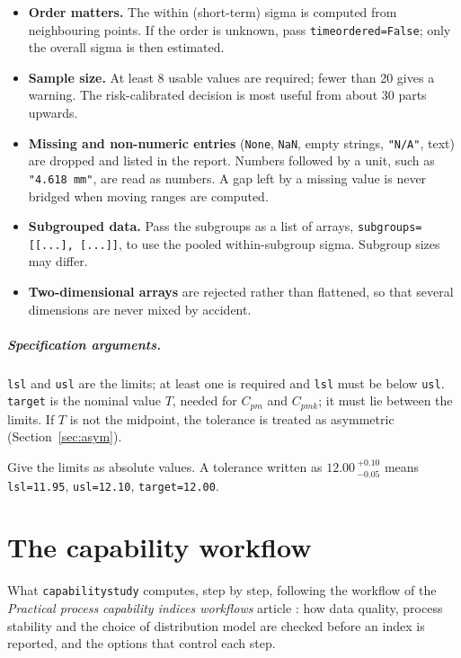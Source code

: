 \documentclass[a4paper,11pt,oneside,openany,parskip=half-,headings=standardclasses,toc=flat,numbers=noenddot]{scrbook}
\newcommand{\code}[1]{\texttt{\begingroup\def\_{\textunderscore\allowbreak}#1\endgroup}}
\newenvironment{chapterintro}{\begingroup\sffamily\small\color{muted}\noindent\ignorespaces}{\par\endgroup\medskip}
\newcommand{\secref}[1]{Section~\ref{#1}}
\begin{document}
\begin{itemize}
\item \textbf{Order matters.} The within (short-term) sigma is computed from neighbouring points. If
  the order is unknown, pass \code{time\_ordered=False}; only the overall sigma is then estimated.
\item \textbf{Sample size.} At least 8 usable values are required; fewer than 20 gives a warning.
  The risk-calibrated decision is most useful from about 30 parts upwards.
\item \textbf{Missing and non-numeric entries} (\code{None}, \code{NaN}, empty strings, \code{"N/A"},
  text) are dropped and listed in the report. Numbers followed by a unit, such as \code{"4.618 mm"},
  are read as numbers. A gap left by a missing value is never bridged when moving ranges are computed.
\item \textbf{Subgrouped data.} Pass the subgroups as a list of arrays, \code{subgroups=[[...], [...]]},
  to use the pooled within-subgroup sigma. Subgroup sizes may differ.
\item \textbf{Two-dimensional arrays} are rejected rather than flattened, so that several dimensions
  are never mixed by accident.
\end{itemize}

\paragraph{Specification arguments.} \code{lsl} and \code{usl} are the limits; at least one is
required and \code{lsl} must be below \code{usl}. \code{target} is the nominal value $T$, needed for
$C_{pm}$ and $C_{pmk}$; it must lie between the limits. If $T$ is not the midpoint, the tolerance is
treated as asymmetric (\secref{sec:asym}).

\begin{caution}
Give the limits as absolute values. A tolerance written as $12.00\,{}^{+0.10}_{-0.05}$ means
\code{lsl=11.95}, \code{usl=12.10}, \code{target=12.00}.
\end{caution}

\chapter{The capability workflow}\label{ch:workflow}

\begin{chapterintro}
What \code{capability\_study} computes, step by step, following the workflow of the
\emph{Practical process capability indices workflows} article \cite{jy-workflow}: how data quality,
process stability and the choice of distribution model are checked before an index is reported, and the
options that control each step.
\end{chapterintro}
\end{document}
